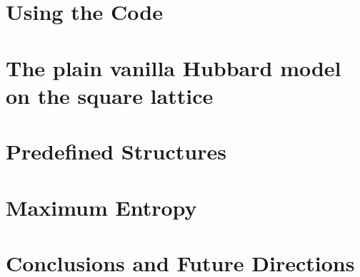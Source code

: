 \documentclass[10pt,Arial]{scrartcl}
\begin{document}
\section{Using the Code}\label{sec:running}

\section{The plain vanilla Hubbard model on the square lattice} \label{sec:vanilla}

\section{Predefined Structures}\label{sec:predefined}


\section{Maximum Entropy}\label{sec:maxent}

\section{Conclusions and Future Directions}\label{sec:con}


\gdef\thesubsection{\Alph{subsection}}
\begin{appendices}


\end{appendices}

%
%
%
%
%

 

\printindex
%
\end{document}
